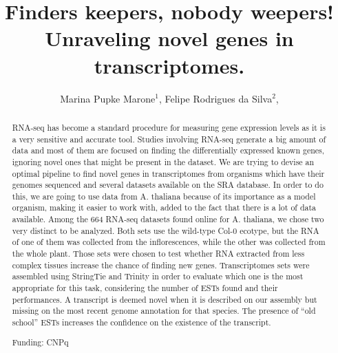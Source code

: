 \documentclass[twoside]{article}
\title{\vspace{-15mm}\fontsize{24pt}{10pt}\selectfont\textbf{ Finders keepers, nobody weepers! Unraveling novel genes in transcriptomes. }} %
\author{ Marina Pupke Marone$^{1}$, Felipe Rodrigues da Silva$^{2}$, }
\affil{ 1 Institute of Biology, University of Campinas

2 Embrapa Informática Agropecuária

 }
\date{}
\begin{document}
  
  
  \maketitle %
  
  
  \thispagestyle{fancy} %
  
  
  \begin{abstract}
  RNA-seq has become a standard procedure for measuring gene expression levels as it is a very sensitive and accurate tool. Studies involving RNA-seq generate a big amount of data and most of them are focused on finding the differentially expressed known genes, ignoring novel ones that might be present in the dataset. 
We are trying to devise an optimal pipeline to find novel genes in transcriptomes from organisms which have their genomes sequenced and several datasets available on the SRA database. In order to do this, we are going to use data from A. thaliana because of its importance as a model organism, making it easier to work with, added to the fact that there is a lot of data available. Among the 664 RNA-seq datasets found online for A. thaliana, we chose two very distinct to be analyzed. Both sets use the wild-type Col-0 ecotype, but the RNA of one of them was collected from the inflorescences, while the other was collected from the whole plant. Those sets were chosen to test whether RNA extracted from less complex tissues increase the chance of finding new genes. 
Transcriptomes sets were assembled using StringTie and Trinity in order to evaluate which one is the most appropriate for this task, considering the number of ESTs found and their performances. A transcript is deemed novel when it is described on our assembly but missing on the most recent genome annotation for that species. The presence of “old school” ESTs increases the confidence on the existence of the transcript.
  
  Funding: CNPq \\ 
  \end{abstract}
  
\end{document}
